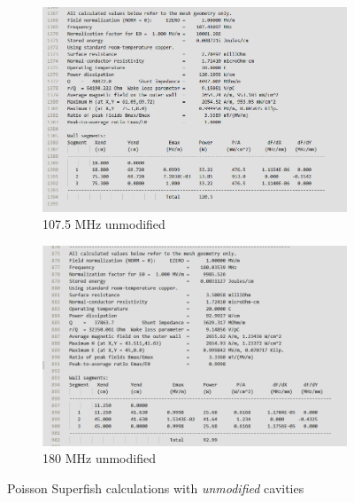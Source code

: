 \documentclass[a4paper,oneside,12pt]{report}
\numberwithin{equation}{chapter}
\begin{document}
\begin{figure}[H]
    \centering
    \begin{subfigure}{.5\textwidth}
      \centering
      \includegraphics[width=0.97\linewidth]{./figures/superfish/superfish107_z.png}
      \caption{107.5 MHz unmodified}
    \end{subfigure}%
    \begin{subfigure}{.5\textwidth}
      \centering
      \includegraphics[width=0.99\linewidth]{./figures/superfish/superfish180_z}
      \caption{180 MHz unmodified}
    \end{subfigure}
    \caption{Poisson Superfish calculations with \textit{unmodified} cavities}
    \label{fig:107_cavity_shunt_diff}
\end{figure}
    
\end{document}
